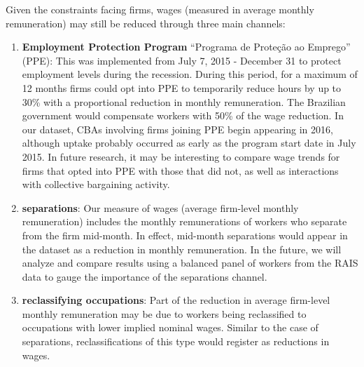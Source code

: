 \documentclass[12pt]{article}
\begin{document}
		Given the constraints facing firms, wages (measured in average monthly remuneration) may still be reduced through three main channels: 
		\begin{enumerate}
			\item \textbf{Employment Protection Program} ``Programa de Proteção ao Emprego'' (PPE): This was implemented from July 7, 2015 -  December 31 to protect employment levels during the recession. During this period,  for a maximum of 12 months firms could opt into PPE to temporarily reduce hours by up to 30\% with a proportional reduction in monthly remuneration. The Brazilian government would compensate workers with 50\% of the wage reduction. In our dataset, CBAs involving firms joining PPE begin appearing in 2016, although uptake probably occurred as early as the program start date in July 2015. In future research, it may be interesting to compare wage trends for firms that opted into PPE with those that did not, as well as interactions with collective bargaining activity.
			\item \textbf{separations}: Our measure of wages (average firm-level monthly remuneration) includes the monthly remunerations of workers who separate from the firm mid-month. In effect, mid-month separations would appear in the dataset as a reduction in monthly remuneration. In the future, we will analyze and compare results using a balanced panel of workers from the RAIS data to gauge the importance of the separations channel.
			\item \textbf{reclassifying occupations}: Part of the reduction in average firm-level monthly remuneration may be due to workers being reclassified to occupations with lower implied nominal wages. Similar to the case of separations, reclassifications of this type would register as reductions in wages.
		\end{enumerate}
\end{document}
